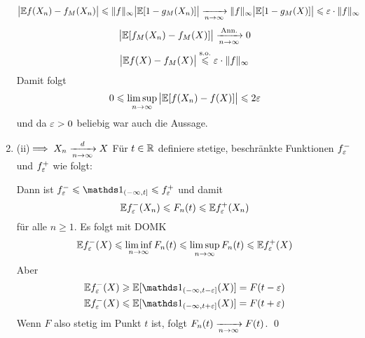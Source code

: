 \begin{enumerate}[label=\Roman*. ]
    \begin{align*}
        \big|\E f(X_n)-f_M(X_n)\big|&\leq\Vert f\Vert_\infty\big|\E[1-g_M(X_n)]\big|\nto{}{n\to\infty}\Vert f\Vert_\infty\big|\E[1-g_M(X)]\big|\leq\eps\cdot\Vert f\Vert_\infty
    \end{align*}
    \begin{align*}
        \big|\E [f_M(X_n)-f_M(X)]\big|\nto{\text{Ann.}}{n\to\infty}0
    \end{align*}
    \begin{align*}
        \big|\mathbb{E} f(X)-f_M(X)\big|\overset{\text{s.o.}}{\leqslant}\varepsilon \cdot\Vert f\Vert_\infty
    \end{align*}
    Damit folgt
    $$0\leqslant\limsup_{n\to\infty}\big|\mathbb{E}[f(X_n)-f(X)]\big|\leqslant2\varepsilon$$
    und da $\varepsilon>0$ beliebig war auch die Aussage.

    \item (ii)$\implies X_n\nto{d}{n\to\infty}X$\newline
    F\"ur $t\in\mathbb{R}$ definiere stetige, beschr\"ankte Funktionen $f_\varepsilon^-$ und $f_\varepsilon^+$ wie folgt: \newline \newline
    \newline      
    Dann ist $f_\eps^-\leq\ind{(-\infty,t]}\leq f_\eps^+$ und damit 
    $$\mathbb{E} f_\varepsilon^-(X_n)\leqslant F_n(t)\leqslant \mathbb{E} f_\varepsilon^+(X_n)$$
    f\"ur alle $n\geq1$. Es folgt mit DOMK 
    $$\mathbb{E} f_\varepsilon^-(X)\leqslant \liminf_{n\to\infty}F_n(t)\leqslant \limsup_{n\to\infty}F_n(t)\leqslant \mathbb{E} f_\varepsilon^+(X)$$
    Aber 
    \begin{align*}
        &\E f_\eps^-(X)\geq\E[\ind{(-\infty,t-\eps]}(X)]=F(t-\eps) \\
        &\E f_\eps^-(X)\leq\E[\ind{(-\infty,t+\eps]}(X)]=F(t+\eps)
    \end{align*}
    Wenn $F$ also stetig im Punkt $t$ ist, folgt $F_n(t)\nto{}{n\to\infty}F(t)$. \qed
\end{enumerate}

